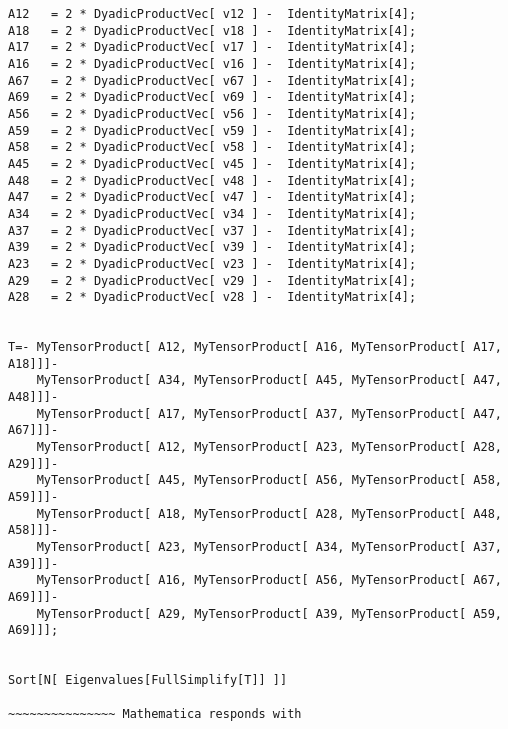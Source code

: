 \documentclass[%
 showpacs,
 showkeys,
 preprintnumbers,
 amsmath,amssymb,
 aps,
  pra,
  longbibliography,
 floatfix,
 ]{revtex4-1}
\begin{document}
{\begin{lstlisting}[backgroundcolor=\color{yellow!10},framerule=0pt,breaklines=true, frame=tb]
A12   = 2 * DyadicProductVec[ v12 ] -  IdentityMatrix[4];
A18   = 2 * DyadicProductVec[ v18 ] -  IdentityMatrix[4];
A17   = 2 * DyadicProductVec[ v17 ] -  IdentityMatrix[4];
A16   = 2 * DyadicProductVec[ v16 ] -  IdentityMatrix[4];
A67   = 2 * DyadicProductVec[ v67 ] -  IdentityMatrix[4];
A69   = 2 * DyadicProductVec[ v69 ] -  IdentityMatrix[4];
A56   = 2 * DyadicProductVec[ v56 ] -  IdentityMatrix[4];
A59   = 2 * DyadicProductVec[ v59 ] -  IdentityMatrix[4];
A58   = 2 * DyadicProductVec[ v58 ] -  IdentityMatrix[4];
A45   = 2 * DyadicProductVec[ v45 ] -  IdentityMatrix[4];
A48   = 2 * DyadicProductVec[ v48 ] -  IdentityMatrix[4];
A47   = 2 * DyadicProductVec[ v47 ] -  IdentityMatrix[4];
A34   = 2 * DyadicProductVec[ v34 ] -  IdentityMatrix[4];
A37   = 2 * DyadicProductVec[ v37 ] -  IdentityMatrix[4];
A39   = 2 * DyadicProductVec[ v39 ] -  IdentityMatrix[4];
A23   = 2 * DyadicProductVec[ v23 ] -  IdentityMatrix[4];
A29   = 2 * DyadicProductVec[ v29 ] -  IdentityMatrix[4];
A28   = 2 * DyadicProductVec[ v28 ] -  IdentityMatrix[4];


T=- MyTensorProduct[ A12, MyTensorProduct[ A16, MyTensorProduct[ A17,  A18]]]-
    MyTensorProduct[ A34, MyTensorProduct[ A45, MyTensorProduct[ A47,  A48]]]-
    MyTensorProduct[ A17, MyTensorProduct[ A37, MyTensorProduct[ A47,  A67]]]-
    MyTensorProduct[ A12, MyTensorProduct[ A23, MyTensorProduct[ A28,  A29]]]-
    MyTensorProduct[ A45, MyTensorProduct[ A56, MyTensorProduct[ A58,  A59]]]-
    MyTensorProduct[ A18, MyTensorProduct[ A28, MyTensorProduct[ A48,  A58]]]-
    MyTensorProduct[ A23, MyTensorProduct[ A34, MyTensorProduct[ A37,  A39]]]-
    MyTensorProduct[ A16, MyTensorProduct[ A56, MyTensorProduct[ A67,  A69]]]-
    MyTensorProduct[ A29, MyTensorProduct[ A39, MyTensorProduct[ A59,  A69]]];


Sort[N[ Eigenvalues[FullSimplify[T]] ]]

~~~~~~~~~~~~~~~ Mathematica responds with


\end{lstlisting}}
\end{document}
